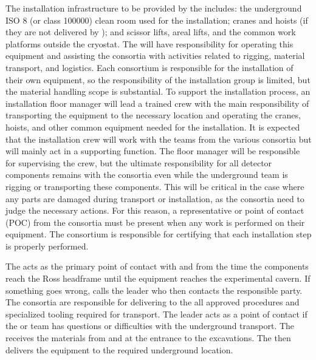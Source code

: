 The installation infrastructure to be provided by the 
includes: the underground ISO 8 (or class \num{100000}) clean room
used for the installation; cranes and hoists (if they are not
delivered by ); and scissor lifts, areal lifts, and the common
work platforms outside the cryostat. The  will have
responsibility for operating this equipment and assisting the
consortia with activities related to rigging, material transport, and
logistics. Each consortium is responsible for the installation of
their own equipment, so the responsibility of the installation group is
limited, but the material handling scope is substantial. To support
the installation process, an installation floor manager will lead a
trained crew with the main responsibility of transporting the
equipment to the necessary location and operating the cranes, hoists,
and other common equipment needed for the installation. It is expected
that the installation crew will work with the teams from the various
consortia but will mainly act in a supporting function. The
 floor manager will be responsible for supervising the
 crew, but the ultimate responsibility for all detector
components remains with the consortia even while the underground
team is rigging or transporting these components.  This will be
critical in the case where any parts are damaged during transport or installation,
as the consortia need to judge the necessary actions. 
For this reason,
a representative or point of contact (POC) from the consortia must be
present when any work is performed on their equipment. The consortium
is responsible for certifying that each installation step is properly
performed.

The  acts as the primary point of contact with
 and \surf from the time the components reach the Ross
headframe until the equipment reaches the experimental cavern. If
something goes wrong, \surf calls the  leader who then
contacts the responsible party. The consortia are responsible for
delivering to the  all approved procedures and specialized
tooling required for transport. The  leader acts as a point
of contact if the or \surf team has questions or difficulties
with the underground transport.  The  receives the
materials from  and \surf at the entrance to the 
excavations. The  then delivers the equipment to the
required underground location.

